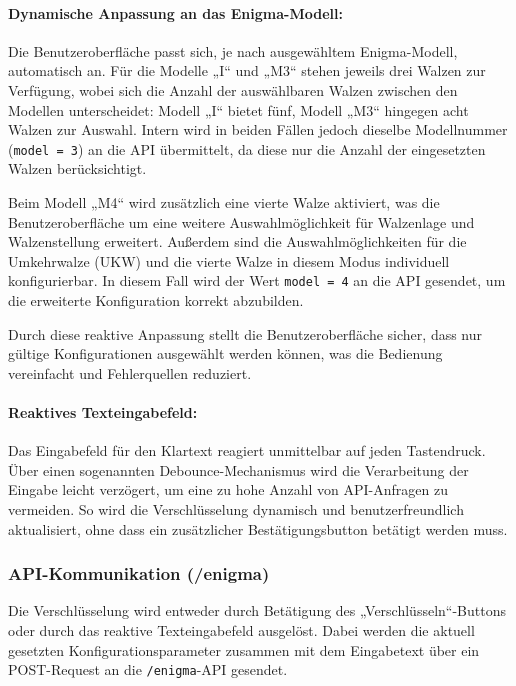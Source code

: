 \documentclass[12pt, ngerman, a4paper, numbers=noenddot]{article}
\begin{document}
\paragraph{Dynamische Anpassung an das Enigma-Modell:}
Die Benutzeroberfläche passt sich, je nach ausgewähltem Enigma-Modell, automatisch an. Für die Modelle „I“ und „M3“ stehen jeweils drei Walzen zur Verfügung, wobei sich die Anzahl der auswählbaren Walzen zwischen den Modellen unterscheidet: Modell „I“ bietet fünf, Modell „M3“ hingegen acht Walzen zur Auswahl. Intern wird in beiden Fällen jedoch dieselbe Modellnummer (\lstinline|model = 3|) an die API übermittelt, da diese nur die Anzahl der eingesetzten Walzen berücksichtigt.

Beim Modell „M4“ wird zusätzlich eine vierte Walze aktiviert, was die Benutzeroberfläche um eine weitere Auswahlmöglichkeit für Walzenlage und Walzenstellung erweitert. Außerdem sind die Auswahlmöglichkeiten für die Umkehrwalze (UKW) und die vierte Walze in diesem Modus individuell konfigurierbar. In diesem Fall wird der Wert \lstinline|model = 4| an die API gesendet, um die erweiterte Konfiguration korrekt abzubilden.

Durch diese reaktive Anpassung stellt die Benutzeroberfläche sicher, dass nur gültige Konfigurationen ausgewählt werden können, was die Bedienung vereinfacht und Fehlerquellen reduziert.

\paragraph{Reaktives Texteingabefeld:}
Das Eingabefeld für den Klartext reagiert unmittelbar auf jeden Tastendruck. Über einen sogenannten Debounce-Mechanismus wird die Verarbeitung der Eingabe leicht verzögert, um eine zu hohe Anzahl von API-Anfragen zu vermeiden. So wird die Verschlüsselung dynamisch und benutzerfreundlich aktualisiert, ohne dass ein zusätzlicher Bestätigungsbutton betätigt werden muss.


\subsubsection{API-Kommunikation (/enigma)}

Die Verschlüsselung wird entweder durch Betätigung des „Verschlüsseln“-Buttons oder durch das reaktive Texteingabefeld ausgelöst. Dabei werden die aktuell gesetzten Konfigurationsparameter zusammen mit dem Eingabetext über ein POST-Request an die \lstinline|/enigma|-API gesendet.
\end{document}
